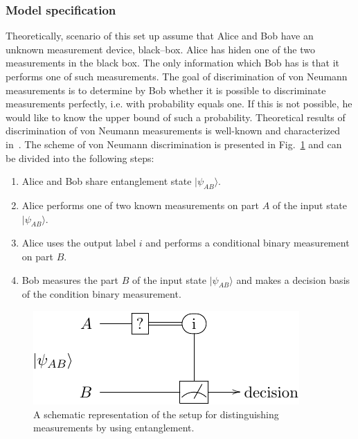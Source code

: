 \documentclass[preprint,12pt, a4paper]{elsarticle}
\newcommand{\ket}[1]{\ensuremath{|#1\rangle}}
\newcommand{\1}{{\rm 1\hspace{-0.9mm}l}}
\begin{document}
\subsubsection{Model specification}
Theoretically, scenario of this set up assume that Alice and Bob have an unknown measurement device, black--box.  Alice has hiden one of the two measurements  in the black box.  The only information which Bob has is that it performs one of such  measurements. 
The  goal of discrimination of von Neumann measurements  is to determine by Bob whether it is possible to discriminate measurements perfectly, i.e. with probability equals one. If this is not possible, he  would like to know the upper bound of such a probability.  Theoretical results of discrimination of von Neumann measurements is well-known and characterized in~\cite{puchala2018strategies}.    The scheme of von Neumann discrimination is presented in Fig.~\ref{fig:scheme} and 
can be divided into the following steps:

\begin{enumerate}
	\item Alice and Bob share entanglement state $\ket{\psi_{AB}}$.
	\item Alice performs one of two known measurements on part $A$ of the input state  $\ket{\psi_{AB}}$.
	\item Alice  uses
	the output label $i$ and performs a conditional binary measurement on part $B$.
	\item  Bob measures the part $B$ of the input state  $\ket{\psi_{AB}}$ and makes a decision  basis of the condition binary measurement.
\end{enumerate}  


 

\begin{figure}[h]
	\centering 
	
	\includegraphics[width=0.9\linewidth]{gates1.pdf} 
	\caption{A schematic representation of the setup for distinguishing
		measurements by using entanglement. }
	\label{fig:scheme}
\end{figure}
\end{document}
